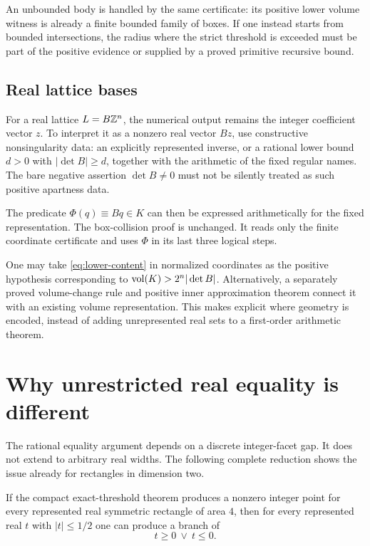 An unbounded body is handled by the same certificate:
its positive lower volume witness is already a finite
bounded family of boxes. If one instead starts from
bounded intersections, the radius where the strict
threshold is exceeded must be part of the positive
evidence or supplied by a proved primitive recursive
bound.

\subsection{Real lattice bases}

For a real lattice \(L=B\mathbb Z^n\), the numerical output
remains the integer coefficient vector \(z\).
To interpret it as a nonzero real vector \(Bz\), use
constructive nonsingularity data: an explicitly
represented inverse, or a rational lower bound \(d>0\)
with \(|\det B|\geq d\), together with the arithmetic
of the fixed regular names. The bare negative
assertion \(\det B\neq0\) must not be silently treated
as such positive apartness data.

The predicate \(\Phi(q)\equiv Bq\in K\) can then be
expressed arithmetically for the fixed representation.
The box-collision proof is unchanged. It reads only the
finite coordinate certificate and uses \(\Phi\) in
its last three logical steps.

One may take \cref{eq:lower-content} in normalized
coordinates as the positive hypothesis corresponding
to \(\operatorname{vol}(K)>2^n|\det B|\).
Alternatively, a separately proved volume-change rule
and positive inner approximation theorem connect it
with an existing volume representation. This makes
explicit where geometry is encoded, instead of
adding unrepresented real sets to a first-order
arithmetic theorem.

\section{Why unrestricted real equality is different}\label{sec:obstruction}

The rational equality argument depends on a discrete
integer-facet gap. It does not extend to arbitrary real
widths. The following complete reduction shows the
issue already for rectangles in dimension two.

\begin{proposition}\label{prop:llpo}
If the compact exact-threshold theorem produces a nonzero
integer point for every represented real symmetric
rectangle of area \(4\), then for every represented real
\(t\) with \(|t|\leq1/2\) one can produce a branch of
\[
                              t\geq0\ \vee\ t\leq0.
\]
\end{proposition}

